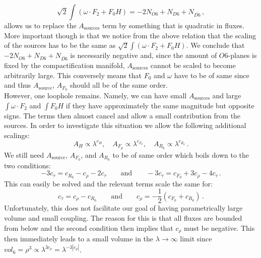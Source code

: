 \documentclass[12pt]{report}
\newcommand{\be}{\begin{equation}}
\newcommand{\ee}{\end{equation}}
\begin{document}
\be 
\sqrt{2} \int \left( \omega \cdot F_2 + F_0 H\right) = -2 N_{O6} + N_{D6} + N_{\overline{D6}}\,,
\ee
allows us to replace the $A_{\text{sources}}$ term by something that is quadratic in fluxes. More important though is that we notice from the above relation that the scaling of the sources has to be the same as $\sqrt{2} \int \left( \omega \cdot F_2 + F_0 H\right)$. We conclude that $-2 N_{O6} + N_{D6} + N_{\overline{D6}}$ is necessarily negative and, since the amount of $O6$-planes is fixed by the compactification manifold, $A_{\text{sources}}$ cannot be scaled to become arbitrarily large. This conversely means that $F_0$ and $\omega$ have to be of same since and thus $A_{\text{source}}$, $A_{F_0}$ should all be of the same order.\\
However, one loophole remains. Namely, we can have small $A_{\text{sources}}$ and large $\int \omega \cdot F_2$ and $\int F_0 H$ if they have approximately the same magnitude but opposite signs. The terms then almost cancel and allow a small contribution from the sources. In order to investigate this situation we allow the following additional scalings:
\be 
A_H \propto \lambda^ {c_H}, \quad A_{F_p} \propto \lambda^ {c_{F_p}},\quad A_{R_6} \propto \lambda^ {c_{R_6}}\,.
\ee
We still need $A_{\text{source}}$, $A_{F_0}$, and $A_{R_6}$ to be of same order which boils down to the two conditions:
\be 
-3 c_\tau = c_{R_6} - c_\rho - 2 c_\tau \qquad \text{and} \qquad -3c_\tau = c_{F_0} + 3 c_\rho - 4 c_\tau\,.
\ee
This can easily be solved and the relevant terms scale the same for:
\be 
c_\tau = c_\rho - c_{R_6} \qquad \text{and} \qquad c_\rho = -\frac{1}{2} \left( c_{F_0} + c_{R_6} \right)\,.
\ee
Unfortunately, this does not facilitate our goal of having parametrically large volume and small coupling. The reason for this is that all fluxes are bounded from below and the second condition then implies that $c_\rho$ must be negative. This then immediately leads to a small volume in the $\lambda \to \infty$ limit since $vol_6 = \rho^ 3 \propto \lambda^ {3 c_\rho} = \lambda^ {-3 |c_\rho|}$.\\
\end{document}
